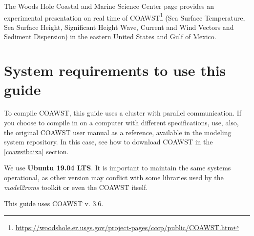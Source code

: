 \noindent The Woods Hole Coastal and Marine Science Center page provides an experimental presentation on real time of 
COAWST\textcolor{bleu_cite}{\textit{}\footnote{\textcolor{bleu_cite}{\href{https://woodshole.er.usgs.gov/project-pages/cccp/public/COAWST.htm}{https://woodshole.er.usgs.gov/project-pages/cccp/public/COAWST.htm}}}}
(Sea Surface Temperature, Sea Surface Height, Significant Height Wave, Current and Wind Vectors and Sediment Dispersion) in the eastern United States and Gulf of Mexico.
\bigskip

\section{System requirements to use this guide}
\bigskip

\noindent To compile COAWST, this guide uses a cluster with parallel communication. If you choose to compile in
on a computer with different specifications, use, also, the original COAWST user manual as a reference, available in the modeling system repository. In this case,
see how to download COAWST in the \textcolor{bleu_cite}{\ref{coawstbaixa}} section.
\bigskip

\noindent We use \textbf{Ubuntu 19.04 LTS}. It is important to maintain the same systems operational, as other version may conflict with some libraries used by the \textit{model2roms} toolkit or 
even the COAWST itself.
\bigskip

\begin{tcolorbox}[enhanced,
    grow to left by=0cm,%
    grow to right by=0cm,%
    enlarge top by=0cm,%
    enlarge bottom by=0cm,%
    tcbox raise base,
    boxrule=1.0pt,
    left=18mm,
    colframe=red!50!black,coltext=red!25!black,colback=red!10!white,
    overlay={\begin{tcbclipinterior}\fill[red!75!blue!50!white] (frame.south west)
      rectangle node[text=white,font=\sffamily\bfseries\footnotesize,rotate=0] {WARNING} ([xshift=18mm]frame.north west);\end{tcbclipinterior}}]
      This guide uses COAWST v. 3.6.
  \end{tcolorbox}
  \bigskip